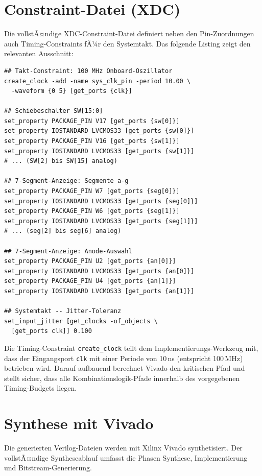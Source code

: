 ﻿\documentclass[12pt,a4paper]{report}
\begin{document}
\section{Constraint-Datei (XDC)}
\label{sec:xdc_constraints}

Die vollstÃ¤ndige XDC-Constraint-Datei definiert neben den Pin-Zuordnungen auch Timing-Constraints fÃ¼r den Systemtakt. Das folgende Listing zeigt den relevanten Ausschnitt:

\begin{lstlisting}[style=bashstyle, caption={Basys3\_Master.xdc -- Ausschnitt fÃ¼r ALU-Design}, label={lst:xdc}]
## Takt-Constraint: 100 MHz Onboard-Oszillator
create_clock -add -name sys_clk_pin -period 10.00 \
  -waveform {0 5} [get_ports {clk}]

## Schiebeschalter SW[15:0]
set_property PACKAGE_PIN V17 [get_ports {sw[0]}]
set_property IOSTANDARD LVCMOS33 [get_ports {sw[0]}]
set_property PACKAGE_PIN V16 [get_ports {sw[1]}]
set_property IOSTANDARD LVCMOS33 [get_ports {sw[1]}]
# ... (SW[2] bis SW[15] analog)

## 7-Segment-Anzeige: Segmente a-g
set_property PACKAGE_PIN W7 [get_ports {seg[0]}]
set_property IOSTANDARD LVCMOS33 [get_ports {seg[0]}]
set_property PACKAGE_PIN W6 [get_ports {seg[1]}]
set_property IOSTANDARD LVCMOS33 [get_ports {seg[1]}]
# ... (seg[2] bis seg[6] analog)

## 7-Segment-Anzeige: Anode-Auswahl
set_property PACKAGE_PIN U2 [get_ports {an[0]}]
set_property IOSTANDARD LVCMOS33 [get_ports {an[0]}]
set_property PACKAGE_PIN U4 [get_ports {an[1]}]
set_property IOSTANDARD LVCMOS33 [get_ports {an[1]}]

## Systemtakt -- Jitter-Toleranz
set_input_jitter [get_clocks -of_objects \
  [get_ports clk]] 0.100
\end{lstlisting}

Die Timing-Constraint \texttt{create\_clock} teilt dem Implementierungs-Werkzeug mit, dass der Eingangsport \texttt{clk} mit einer Periode von 10\,ns (entspricht 100\,MHz) betrieben wird. Darauf aufbauend berechnet Vivado den kritischen Pfad und stellt sicher, dass alle Kombinationslogik-Pfade innerhalb des vorgegebenen Timing-Budgets liegen.

\section{Synthese mit Vivado}
\label{sec:vivado_synthese}

Die generierten Verilog-Dateien werden mit Xilinx Vivado synthetisiert. Der vollstÃ¤ndige Syntheseablauf umfasst die Phasen Synthese, Implementierung und Bitstream-Generierung.
\end{document}

